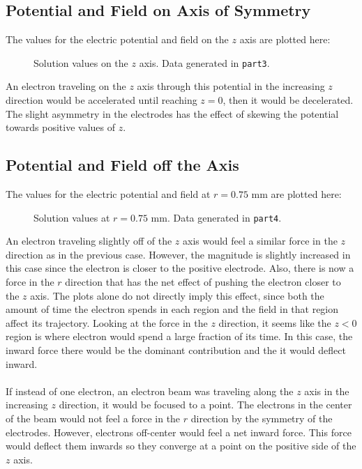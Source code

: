 \documentclass[12pt]{article}
\begin{document}
\subsection{Potential and Field on Axis of Symmetry}
The values for the electric potential and field on the $z$ axis are plotted here:
\begin{figure}[H]
 \qquad
{} \qquad
\caption{Solution values on the $z$ axis. Data generated in \texttt{part3}.}
\end{figure}
An electron traveling on the $z$ axis through this potential in the increasing $z$ direction would be accelerated until reaching $z=0$, then it would be decelerated. The slight asymmetry in the electrodes has the effect of skewing the potential towards positive values of $z$.
\subsection{Potential and Field off the Axis}
The values for the electric potential and field at $r = 0.75$ mm are plotted here:
\begin{figure}[H]
 \qquad
{} \qquad
{} \qquad
\caption{Solution values at $r=0.75$ mm. Data generated in \texttt{part4}.}
\end{figure}
An electron traveling slightly off of the $z$ axis would feel a similar force in the $z$ direction as in the previous case. However, the magnitude is slightly increased in this case since the electron is closer to the positive electrode. Also, there is now a force in the $r$ direction that has the net effect of pushing the electron closer to the $z$ axis. The plots alone do not directly imply this effect, since both the amount of time the electron spends in each region and the field in that region affect its trajectory. Looking at the force in the $z$ direction, it seems like the $z < 0$ region is where electron would spend a large fraction of its time. In this case, the inward force there would be the dominant contribution and the it would deflect inward.\\ \\
If instead of one electron, an electron beam was traveling along the $z$ axis in the increasing $z$ direction, it would be focused to a point. The electrons in the center of the beam would not feel a force in the $r$ direction by the symmetry of the electrodes. However, electrons off-center would feel a net inward force. This force would deflect them inwards so they converge at a point on the positive side of the $z$ axis.
\end{document}
